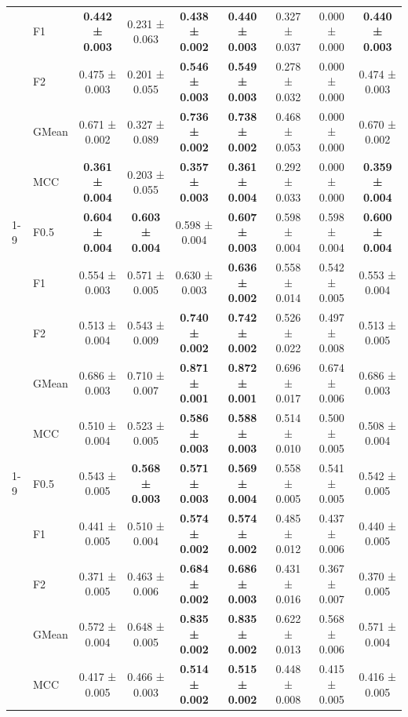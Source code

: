 \begin{table}[H]
{\begin{tabular}{llccccccc}
 & F1 & \textbf{0.442 ± 0.003} & 0.231 ± 0.063 & \textbf{0.438 ± 0.002} & \textbf{0.440 ± 0.003} & 0.327 ± 0.037 & 0.000 ± 0.000 & \textbf{0.440 ± 0.003} \\
 & F2 & 0.475 ± 0.003 & 0.201 ± 0.055 & \textbf{0.546 ± 0.003} & \textbf{0.549 ± 0.003} & 0.278 ± 0.032 & 0.000 ± 0.000 & 0.474 ± 0.003 \\
 & GMean & 0.671 ± 0.002 & 0.327 ± 0.089 & \textbf{0.736 ± 0.002} & \textbf{0.738 ± 0.002} & 0.468 ± 0.053 & 0.000 ± 0.000 & 0.670 ± 0.002 \\
 & MCC & \textbf{0.361 ± 0.004} & 0.203 ± 0.055 & \textbf{0.357 ± 0.003} & \textbf{0.361 ± 0.004} & 0.292 ± 0.033 & 0.000 ± 0.000 & \textbf{0.359 ± 0.004} \\
\cline{1-9}
\multirow[t]{5}{*}{LGBM()} & F0.5 & \textbf{0.604 ± 0.004} & \textbf{0.603 ± 0.004} & 0.598 ± 0.004 & \textbf{0.607 ± 0.003} & 0.598 ± 0.004 & 0.598 ± 0.004 & \textbf{0.600 ± 0.004} \\
 & F1 & 0.554 ± 0.003 & 0.571 ± 0.005 & 0.630 ± 0.003 & \textbf{0.636 ± 0.002} & 0.558 ± 0.014 & 0.542 ± 0.005 & 0.553 ± 0.004 \\
 & F2 & 0.513 ± 0.004 & 0.543 ± 0.009 & \textbf{0.740 ± 0.002} & \textbf{0.742 ± 0.002} & 0.526 ± 0.022 & 0.497 ± 0.008 & 0.513 ± 0.005 \\
 & GMean & 0.686 ± 0.003 & 0.710 ± 0.007 & \textbf{0.871 ± 0.001} & \textbf{0.872 ± 0.001} & 0.696 ± 0.017 & 0.674 ± 0.006 & 0.686 ± 0.003 \\
 & MCC & 0.510 ± 0.004 & 0.523 ± 0.005 & \textbf{0.586 ± 0.003} & \textbf{0.588 ± 0.003} & 0.514 ± 0.010 & 0.500 ± 0.005 & 0.508 ± 0.004 \\
\cline{1-9}
\multirow[t]{5}{*}{LogisticRegression()} & F0.5 & 0.543 ± 0.005 & \textbf{0.568 ± 0.003} & \textbf{0.571 ± 0.003} & \textbf{0.569 ± 0.004} & 0.558 ± 0.005 & 0.541 ± 0.005 & 0.542 ± 0.005 \\
 & F1 & 0.441 ± 0.005 & 0.510 ± 0.004 & \textbf{0.574 ± 0.002} & \textbf{0.574 ± 0.002} & 0.485 ± 0.012 & 0.437 ± 0.006 & 0.440 ± 0.005 \\
 & F2 & 0.371 ± 0.005 & 0.463 ± 0.006 & \textbf{0.684 ± 0.002} & \textbf{0.686 ± 0.003} & 0.431 ± 0.016 & 0.367 ± 0.007 & 0.370 ± 0.005 \\
 & GMean & 0.572 ± 0.004 & 0.648 ± 0.005 & \textbf{0.835 ± 0.002} & \textbf{0.835 ± 0.002} & 0.622 ± 0.013 & 0.568 ± 0.006 & 0.571 ± 0.004 \\
 & MCC & 0.417 ± 0.005 & 0.466 ± 0.003 & \textbf{0.514 ± 0.002} & \textbf{0.515 ± 0.002} & 0.448 ± 0.008 & 0.415 ± 0.005 & 0.416 ± 0.005 \\

\end{tabular}}
\end{table}
